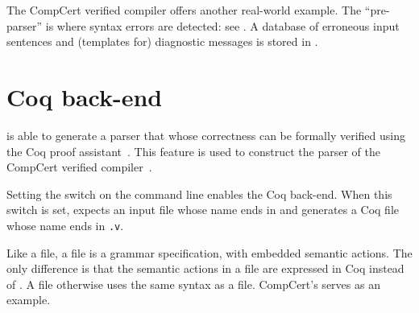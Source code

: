 \documentclass[onecolumn,11pt,nocopyrightspace,preprint]{sigplanconf}
\begin{document}
The CompCert verified compiler offers another real-world example. The
``pre-parser'' is where syntax errors are detected: see
.
A database of erroneous input sentences and (templates for) diagnostic
messages is stored in .


\section{Coq back-end}
\label{sec:coq}

\menhir is able to generate a parser that whose correctness can be formally
verified using the Coq proof assistant~\cite{jourdan-leroy-pottier-12}. This
feature is used to construct the parser of the CompCert verified
compiler~\cite{compcert}.

Setting the \ocoq switch on the command line enables the Coq back-end.  When
this switch is set, \menhir expects an input file whose name ends
in \vy and generates a Coq file whose name ends
in \texttt{.v}.

Like a \mly file, a \vy file is a grammar specification,
with embedded semantic actions. The only difference is that the semantic
actions in a \vy file are expressed in Coq instead
of \ocaml. A \vy file otherwise uses the same syntax as
a \mly file. CompCert's
serves as an example.
\end{document}
